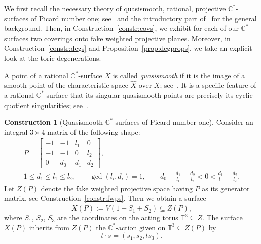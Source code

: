 \documentclass[10pt,a4paper]{amsart}
\theoremstyle{definition}
\newtheorem{constr}[thm]{Construction}
\def\CC{{\mathbb C}}
\def\TT{{\mathbb T}}
\begin{document}
We first recall the necessary theory of quasismooth,
rational, projective $\CC^*$-surfaces of Picard number
one; see~\cite[Section~5.4]{ArDeHaLa} and the introductory
part of~\cite{HaHaHaSp} for the general background.
Then, in Construction~\ref{constr:covs}, we exhibit
for each of our $\CC^*$-surfaces two coverings onto
fake weighted projective planes.
Moreover, in Construction~\ref{constr:degs} and
Proposition~\ref{prop:degprops}, we take an explicit
look at the toric degenerations.

A point of a rational
$\CC^*$-surface $X$ is called \emph{quasismooth}
if it is the image of a smooth point of the
characteristic space $\hat X$ over $X$;
see~\cite[Section~5]{HaHaHaSp}.
It is a specific feature of a rational
$\CC^*$-surface that its singular quasismooth
points are precisely its cyclic quotient
singularities; see~\cite[Corollary~6.12]{HaHu}.


\begin{constr}[Quasismooth $\CC^*$-surfaces of Picard number one]
\label{constr:cstarsurf}
Consider an integral $3 \times 4$ matrix of the following shape:
\begin{gather*}
P
 =
\begin{bmatrix}
-1 & -1 & l_1 & 0
\\
-1 & -1 & 0 & l_2
\\
0 & d_0 & d_1 & d_2
\end{bmatrix},
\\
1 \le d_1 \le l_1 \le l_2, \qquad \gcd(l_i,d_i) = 1,
\qquad
d_0 + \frac{d_1}{l_1} + \frac{d_2}{l_2} < 0 < \frac{d_1}{l_1} + \frac{d_2}{l_2}.
\end{gather*}
Let $Z(P)$ denote the fake weighted projective space
having $P$ as its generator matrix, see Construction~\ref{constr:fwps}.
Then we obtain a surface
\[
X(P) := \overline{V(1+S_1+S_2)} \subseteq Z(P),
\]
where $S_1$, $S_2$, $S_3$ are the coordinates on the acting
torus $\TT^3 \subseteq Z$.
The surface $X(P)$ inherits from $Z(P)$ the $\CC^*$-action
given on $\TT^3 \subseteq Z(P)$ by
\[
t \cdot s = (s_1,s_2,ts_3).
\]
\end{constr}
\end{document}
